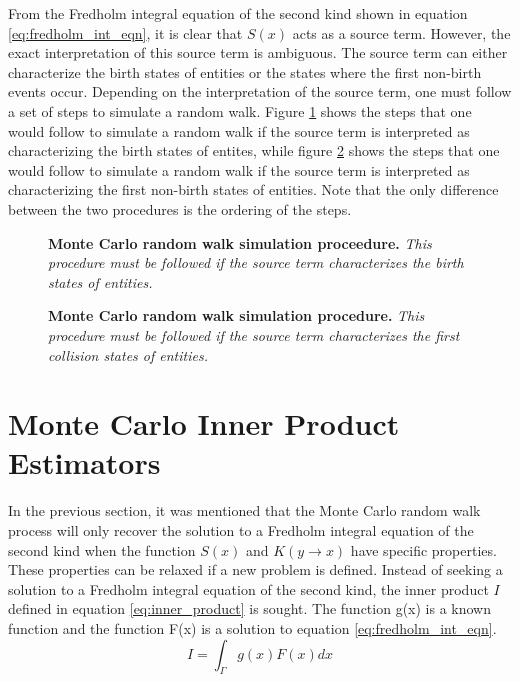 From the Fredholm integral equation of the second kind shown in equation
\ref{eq:fredholm_int_eqn}, it is clear that $S(x)$ acts as a source term.
However, the exact interpretation of this source term is ambiguous. The
source term can either characterize the birth states of entities or the
states where the first non-birth events occur. Depending on the interpretation 
of the source term, one must follow a set of steps to simulate a random walk.
Figure \ref{fig:random_walk_process_1} shows the steps that one would follow
to simulate a random walk if the source term is interpreted as characterizing
the birth states of entites, while figure \ref{fig:random_walk_process_2}
shows the steps that one would follow to simulate a random walk if the
source term is interpreted as characterizing the first non-birth states of
entities. Note that the only difference between the two procedures is the
ordering of the steps.
\begin{figure}[t!]
  \begin{center}
  \end{center}
  \caption{\textbf{Monte Carlo random walk simulation proceedure.} \textit{This
      procedure must be followed if the source term characterizes the birth
      states of entities.} }
  \label{fig:random_walk_process_1}
\end{figure}
\begin{figure}[t!]
  \begin{center}
  \end{center}
  \caption{\textbf{Monte Carlo random walk simulation procedure.} \textit{This
      procedure must be followed if the source term characterizes the first
      collision states of entities.} }
  \label{fig:random_walk_process_2}
\end{figure}

\section{Monte Carlo Inner Product Estimators}
\label{sec:mc_int_eqn_estimators}
In the previous section, it was mentioned that the Monte Carlo random walk
process will only recover the solution to a Fredholm integral equation of 
the second kind when the function $S(x)$ and $K(y \to x)$ have specific
properties. These properties can be relaxed if a new problem is defined. 
Instead of seeking a solution to a Fredholm integral equation of the second 
kind, the inner product $I$ defined in equation \ref{eq:inner_product} is 
sought. The function g(x) is a known function and the function F(x) is a 
solution to equation \ref{eq:fredholm_int_eqn}. 
\begin{equation}
  I = \int_{\Gamma} g(x)F(x)dx
  \label{eq:inner_product}
\end{equation}

